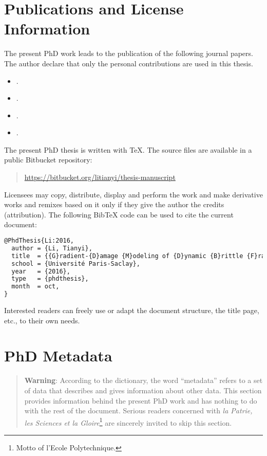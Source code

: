 \section*{Publications and License Information}
The present PhD work leads to the publication of the following journal papers. The author declare that only the personal contributions are used in this thesis.
\begin{itemize}
\item {}. 
\item {}. 
\item {}. 
\item {}. 
\end{itemize}

The present PhD thesis is written with \TeX. The source files are available in a public Bitbucket repository:
\begin{quotation}
\url{https://bitbucket.org/litianyi/thesis-manuscript}
\end{quotation}

\doclicenseThis

Licensees may copy, distribute, display and perform the work and make derivative works and remixes based on it only if they give the author the credits (attribution). The following BibTeX code can be used to cite the current document:
\begin{lstlisting}[language=TeX]
@PhdThesis{Li:2016,
  author = {Li, Tianyi},
  title  = {{G}radient-{D}amage {M}odeling of {D}ynamic {B}rittle {F}racture: {V}ariational {P}rinciples and {N}umerical {S}imulations},
  school = {Université Paris-Saclay},
  year   = {2016},
  type   = {phdthesis},
  month  = oct,
}
\end{lstlisting}

Interested readers can freely use or adapt the document structure, the title page, etc., to their own needs.

\section*{PhD Metadata}
\begin{quotation}
\textbf{Warning}: According to the dictionary, the word ``metadata'' refers to a set of data that describes and gives information about other data. This section provides information behind the present PhD work and has nothing to do with the rest of the document. Serious readers concerned with \emph{la Patrie, les Sciences et la Gloire}\footnote{Motto of l'Ecole Polytechnique.} are sincerely invited to skip this section.
\end{quotation}

